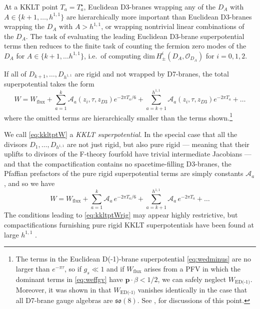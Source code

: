 \documentclass[12pt,a4wide]{article}
\begin{document}
At a KKLT point $T_a = T_a^{\star}$, Euclidean D3-branes wrapping any of the $D_A$ with $A \in \{k+1,\ldots, h^{1,1}\}$ are hierarchically more important than Euclidean D3-branes wrapping 
the $D_A$ with $A > h^{1,1}$, or wrapping nontrivial linear combinations of the $D_A$.  The task of evaluating the leading Euclidean D3-brane superpotential terms then reduces to the finite task of counting the fermion zero modes of the $D_A$ for $A \in \{k+1,\ldots h^{1,1}\}$,
i.e.~of computing
$\text{dim}\,H^{i}_{\pm}(D_A,\mathcal{O}_{D_A})$ for $i = 0, 1, 2$.

If all of $D_{k+1}, \ldots, D_{h^{1,1}}$ are rigid and not wrapped by D7-branes, the total superpotential takes the form
\begin{equation}\label{eq:kkltptW}
W = W_{\text{flux}} + \sum_{a=1}^{k} \mathcal{A}_a(z_i,\tau, z_{D3}) e^{-2\pi T_a/6} +
 \sum_{a=k+1}^{h^{1,1}} \mathcal{A}_a(z_i,\tau, z_{D3}) e^{-2\pi T_a} + \ldots
\end{equation}
where the omitted terms are hierarchically smaller than the terms shown.\footnote{The terms in the Euclidean D(-1)-brane superpotential 
\eqref{eq:wedminus} are no larger than $e^{-\pi\tau}$, so if $g_s \ll 1$ and if $W_{\text{flux}}$ arises from a PFV in which 
the dominant terms in \eqref{eq:weffgv} have $\mathbf{p}{\cdot}\beta<1/2$, we can safely neglect $W_{\text{ED(-1)}}$.
Moreover, it was shown in \cite{Kim:2022jvv} that $W_{\text{ED(-1)}}$ vanishes identically in the case that all D7-brane gauge algebras are $\mathfrak{so}(8)$. See \cite{Demirtas:2021nlu}, \cite{Kim:2022jvv} for discussions of this point.}

We call \eqref{eq:kkltptW} a \emph{KKLT superpotential}.
In the special case that all the divisors $D_1,\ldots,D_{h^{1,1}}$ are not just rigid, but also pure rigid
--- meaning that their uplifts to divisors of the F-theory fourfold have trivial intermediate Jacobians --- and that the compactification contains no spacetime-filling D3-branes, the Pfaffian prefactors of the pure rigid superpotential terms are simply constants $\mathcal{A}_a$, and so we have
\begin{equation}\label{eq:kkltptWrig}
W = W_{\text{flux}} + \sum_{a=1}^{k} \mathcal{A}_a\, e^{-2\pi T_a/6} +
 \sum_{a=k+1}^{h^{1,1}} \mathcal{A}_a\,e^{-2\pi T_a} + \ldots
\end{equation}
The conditions leading to \eqref{eq:kkltptWrig} may appear highly restrictive, but compactifications furnishing pure rigid KKLT superpotentials have been found at large $h^{1,1}$ \cite{Demirtas:2021nlu,coni}.
\end{document}
